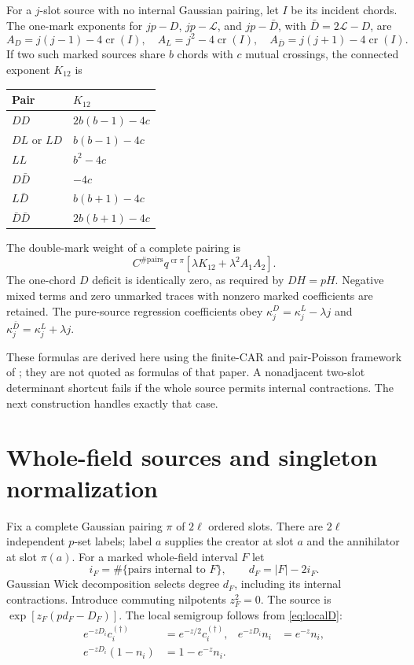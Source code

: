 \documentclass[11pt]{article}
\newcommand{\LL}{\mathcal L}
\newcommand{\crs}{\operatorname{cr}}
\begin{document}
For a $j$-slot source with no internal Gaussian pairing, let $I$ be
its incident chords. The one-mark exponents for $jp-D$, $jp-\LL$,
and $jp-\bar D$, with $\bar D=2\LL-D$, are
\begin{equation}
 A_D=j(j-1)-4\crs(I),\quad
 A_L=j^2-4\crs(I),\quad
 A_{\bar D}=j(j+1)-4\crs(I).\label{eq:pure}
\end{equation}
If two such marked sources share $b$ chords with $c$ mutual crossings,
the connected exponent $K_{12}$ is
\begin{center}
\begin{tabular}{ll}
\toprule Pair & $K_{12}$\\\midrule
$DD$ & $2b(b-1)-4c$\\
$DL$ or $LD$ & $b(b-1)-4c$\\
$LL$ & $b^2-4c$\\
$D\bar D$ & $-4c$\\
$L\bar D$ & $b(b+1)-4c$\\
$\bar D\bar D$ & $2b(b+1)-4c$\\\bottomrule
\end{tabular}
\end{center}
The double-mark weight of a complete pairing is
\begin{equation}
 C^{\#\mathrm{pairs}}q^{\crs\pi}
       [\lambda K_{12}+\lambda^2A_1A_2].\label{eq:pureweight}
\end{equation}
The one-chord $D$ deficit is identically zero, as required by $DH=pH$.
Negative mixed terms and zero unmarked traces with nonzero marked
coefficients are retained. The pure-source regression coefficients
obey $\kappa_j^D=\kappa_j^L-\lambda j$ and
$\kappa_j^{\bar D}=\kappa_j^L+\lambda j$.

These formulas are derived here using the finite-CAR and pair-Poisson
framework of \cite[Sec.~3.2--3.3]{BNR}; they are not quoted as formulas
of that paper. A nonadjacent two-slot determinant shortcut fails if
the whole source permits internal contractions. The next construction
handles exactly that case.

\newpage
\section{Whole-field sources and singleton normalization}
Fix a complete Gaussian pairing $\pi$ of $2\ell$ ordered slots.
There are $2\ell$ independent $p$-set labels; label $a$ supplies the
creator at slot $a$ and the annihilator at slot $\pi(a)$.
For a marked whole-field interval $F$ let
\begin{equation}
 i_F=\#\{\text{pairs internal to }F\},\qquad d_F=|F|-2i_F.
\end{equation}
Gaussian Wick decomposition selects degree $d_F$, including its
internal contractions. Introduce commuting nilpotents $z_F^2=0$.
The source is $\exp[z_F(pd_F-D_F)]$.
The local semigroup follows from \eqref{eq:localD}:
\begin{align}
 e^{-zD_i}c_i^{(\dagger)}&=e^{-z/2}c_i^{(\dagger)},&
 e^{-zD_i}n_i&=e^{-z}n_i,\\
 e^{-zD_i}(1-n_i)&=1-e^{-z}n_i.&
\end{align}
\end{document}

